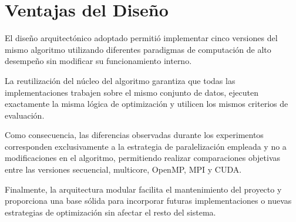 \section{Ventajas del Diseño}

El diseño arquitectónico adoptado permitió implementar cinco versiones del mismo algoritmo utilizando diferentes paradigmas de computación de alto desempeño sin modificar su funcionamiento interno.

La reutilización del núcleo del algoritmo garantiza que todas las implementaciones trabajen sobre el mismo conjunto de datos, ejecuten exactamente la misma lógica de optimización y utilicen los mismos criterios de evaluación.

Como consecuencia, las diferencias observadas durante los experimentos corresponden exclusivamente a la estrategia de paralelización empleada y no a modificaciones en el algoritmo, permitiendo realizar comparaciones objetivas entre las versiones secuencial, multicore, OpenMP, MPI y CUDA.

Finalmente, la arquitectura modular facilita el mantenimiento del proyecto y proporciona una base sólida para incorporar futuras implementaciones o nuevas estrategias de optimización sin afectar el resto del sistema.